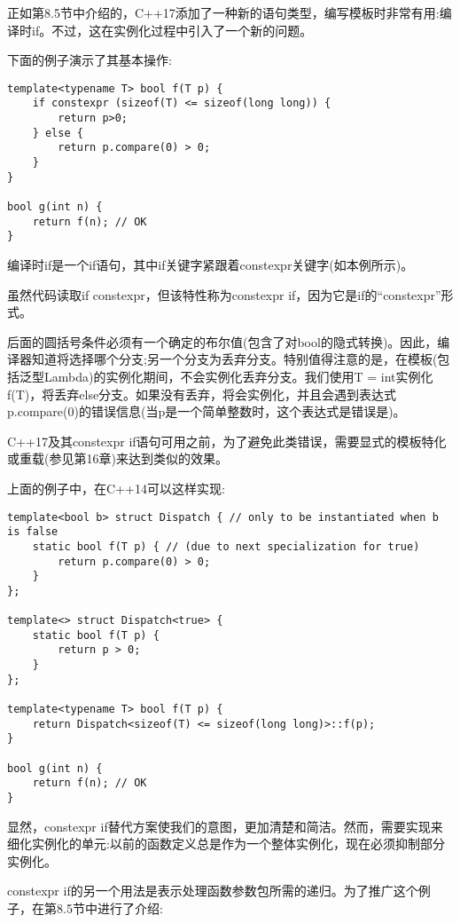 正如第8.5节中介绍的，C++17添加了一种新的语句类型，编写模板时非常有用:编译时if。不过，这在实例化过程中引入了一个新的问题。

下面的例子演示了其基本操作:

\begin{lstlisting}[style=styleCXX]
template<typename T> bool f(T p) {
	if constexpr (sizeof(T) <= sizeof(long long)) {
		return p>0;
	} else {
		return p.compare(0) > 0;
	}
}

bool g(int n) {
	return f(n); // OK
}
\end{lstlisting}

编译时if是一个if语句，其中if关键字紧跟着constexpr关键字(如本例所示)。

\begin{tcolorbox}[colback=webgreen!5!white,colframe=webgreen!75!black]
\hspace*{0.75cm}虽然代码读取if constexpr，但该特性称为constexpr if，因为它是if的“constexpr”形式。
\end{tcolorbox}

后面的圆括号条件必须有一个确定的布尔值(包含了对bool的隐式转换)。因此，编译器知道将选择哪个分支;另一个分支为丢弃分支。特别值得注意的是，在模板(包括泛型Lambda)的实例化期间，不会实例化丢弃分支。我们使用T = int实例化f(T)，将丢弃else分支。如果没有丢弃，将会实例化，并且会遇到表达式p.compare(0)的错误信息(当p是一个简单整数时，这个表达式是错误是)。

C++17及其constexpr if语句可用之前，为了避免此类错误，需要显式的模板特化或重载(参见第16章)来达到类似的效果。

上面的例子中，在C++14可以这样实现:

\begin{lstlisting}[style=styleCXX]
template<bool b> struct Dispatch { // only to be instantiated when b is false
	static bool f(T p) { // (due to next specialization for true)
		return p.compare(0) > 0;
	}
};

template<> struct Dispatch<true> {
	static bool f(T p) {
		return p > 0;
	}
};

template<typename T> bool f(T p) {
	return Dispatch<sizeof(T) <= sizeof(long long)>::f(p);
}

bool g(int n) {
	return f(n); // OK
}
\end{lstlisting}

显然，constexpr if替代方案使我们的意图，更加清楚和简洁。然而，需要实现来细化实例化的单元:以前的函数定义总是作为一个整体实例化，现在必须抑制部分实例化。

constexpr if的另一个用法是表示处理函数参数包所需的递归。为了推广这个例子，在第8.5节中进行了介绍:

